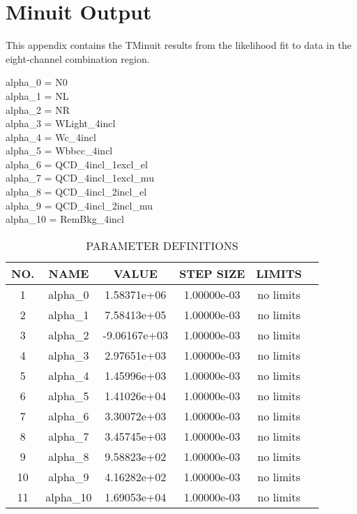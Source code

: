 \clearpage
\section{Minuit Output}
\label{app:minuitOutput}
This appendix contains the TMinuit results from the likelihood fit to data in the eight-channel combination region.

alpha\_0 = N0\\
alpha\_1 = NL\\
alpha\_2 = NR\\
alpha\_3 = WLight\_4incl\\
alpha\_4 = Wc\_4incl\\
alpha\_5 = Wbbcc\_4incl\\
alpha\_6 = QCD\_4incl\_1excl\_el\\
alpha\_7 = QCD\_4incl\_1excl\_mu\\
alpha\_8 = QCD\_4incl\_2incl\_el\\
alpha\_9 = QCD\_4incl\_2incl\_mu\\
alpha\_10 = RemBkg\_4incl\\


 \begin{table}[!ht]
 \centering
 \begin{tabular}{c c c c c c}

    NO. & NAME    &     VALUE   &   STEP SIZE  &  LIMITS \\ \hline
     1 & alpha\_0   &  1.58371e+06      & 1.00000e-03  &  no limits \\ 
     2 & alpha\_1   &  7.58413e+05      & 1.00000e-03  &   no limits\\
     3 & alpha\_2   &  -9.06167e+03     & 1.00000e-03  &   no limits\\
     4 & alpha\_3   &  2.97651e+03      & 1.00000e-03  &  no limits \\ 
     5 & alpha\_4   &  1.45996e+03      & 1.00000e-03  &  no limits \\ 
     6 & alpha\_5   &  1.41026e+04      & 1.00000e-03  &  no limits \\ 
     7 & alpha\_6   &  3.30072e+03      & 1.00000e-03  &  no limits \\ 
     8 & alpha\_7   &  3.45745e+03      & 1.00000e-03  &  no limits \\ 
     9 & alpha\_8   &  9.58823e+02      & 1.00000e-03  &  no limits \\ 
    10 & alpha\_9   &  4.16282e+02      & 1.00000e-03  &  no limits \\ 
    11 & alpha\_10  &  1.69053e+04     & 1.00000e-03  &  no limits \\ \hline
    
    
    \end{tabular}
    \caption{PARAMETER DEFINITIONS}
    \end{table}
  
